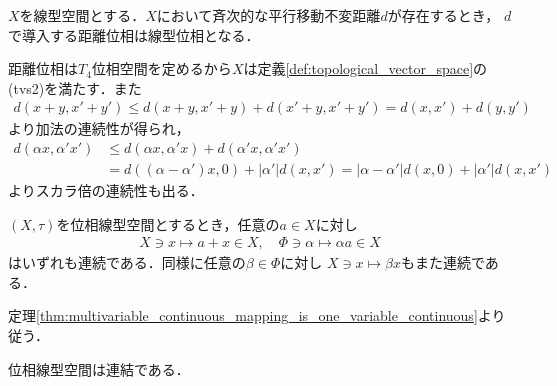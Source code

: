 	\begin{screen}
		\begin{thm}[斉次的な平行移動不変距離による距離位相は線型位相]
			$X$を線型空間とする．$X$において斉次的な平行移動不変距離$d$が存在するとき，
			$d$で導入する距離位相は線型位相となる．
		\end{thm}
	\end{screen}
	
	\begin{prf}
		距離位相は$T_4$位相空間を定めるから$X$は定義\ref{def:topological_vector_space}の(tvs2)を満たす．また
		\begin{align}
			d(x+y,x'+y') \leq d(x+y,x'+y) + d(x'+y,x'+y') = d(x,x') + d(y,y')
		\end{align}
		より加法の連続性が得られ，
		\begin{align}
			d(\alpha x, \alpha'x') &\leq d(\alpha x, \alpha'x) + d(\alpha'x,\alpha'x') \\
			&= d((\alpha - \alpha') x, 0) + |\alpha'|d(x,x')
			= |\alpha-\alpha'|d(x,0) + |\alpha'|d(x,x')
		\end{align}
		よりスカラ倍の連続性も出る．
		\QED
	\end{prf}
	
	\begin{screen}
		\begin{thm}\label{thm:continuity_of_translations_multiples}
			$(X,\tau)$を位相線型空間とするとき，任意の$a \in X$に対し
			\begin{align}
				X \ni x \longmapsto a + x \in X,
				\quad \Phi \ni \alpha \longmapsto \alpha a \in X
			\end{align}
			はいずれも連続である．同様に任意の$\beta \in \Phi$に対し
			$X \ni x \longmapsto \beta x$もまた連続である．
		\end{thm}
	\end{screen}
	
	\begin{prf}
		定理\ref{thm:multivariable_continuous_mapping_is_one_variable_continuous}より従う．
		\QED
	\end{prf}
	
	\begin{screen}
		\begin{thm}[位相線型空間の連結性]\label{thm:topological_vector_spaces_connected}
			位相線型空間は連結である．
		\end{thm}
	\end{screen}
	
